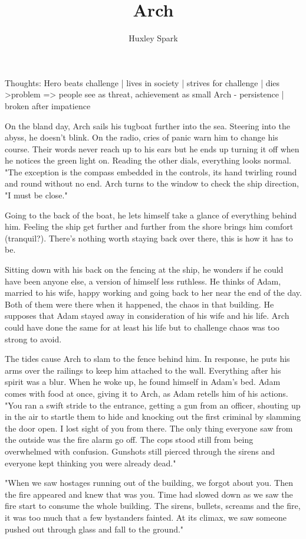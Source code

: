 \title{Arch}
\author{Huxley Spark}

		Thoughts: Hero beats challenge | lives in society | strives for challenge | dies
			>problem => people see as threat, achievement as small
			Arch - persistence | broken after impatience

		On the bland day, Arch sails his tugboat further into the sea. Steering into the abyss, he doesn't blink. On the radio, cries of panic warn him to 
	change his course. Their words never reach up to his ears but he ends up turning it off when he notices the green light on. Reading the other dials, everything
	looks normal. "The exception is the compass embedded in the controls, its hand twirling round and round without no end. Arch turns to the window to check the
	ship direction, "I must be close."

		Going to the back of the boat, he lets himself take a glance  of everything behind him. Feeling the ship get further and further from the shore brings
	him comfort (tranquil?). There's nothing worth staying back over there, this is how it has to be.

		Sitting down with his back on the fencing at the ship, he wonders if he could have been anyone else, a version of himself less ruthless. He thinks of
	Adam, married to his wife, happy working and going back to her near the end of the day. Both of them were there when it happened, the chaos in that building.
	He supposes that Adam stayed away in consideration of his wife and his life. Arch could have done the same for at least his life but to challenge chaos was
	too strong to avoid.

		The tides cause Arch to slam to the fence behind him. In response, he puts his arms over the railings to keep him attached to the wall. Everything
	after his spirit was a blur. When he woke up, he found himself in Adam's bed. Adam comes with food at once, giving it to Arch, as Adam retells him of his
	actions. "You ran a swift stride to the entrance, getting a gun from an officer, shouting up in the air to startle them to hide and knocking out the first
	criminal by slamming the door open. I lost sight of you from there. The only thing everyone saw from the outside was the fire alarm go off. The cops stood 
	still from being overwhelmed with confusion. Gunshots still pierced through the sirens and everyone kept thinking you were already dead."

		"When we saw hostages running out of the building, we forgot about you. Then the fire appeared and knew that was you. Time had slowed down as we saw
	the fire start to consume the whole building. The sirens, bullets, screams and the fire, it was too much that a few bystanders fainted. At its climax, we
	saw someone pushed out through glass and fall to the ground."

